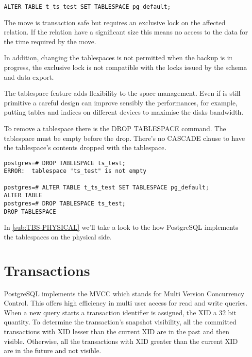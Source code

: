 \begin{lstlisting}[style=pgsql]
ALTER TABLE t_ts_test SET TABLESPACE pg_default;
\end{lstlisting}

The move is transaction safe but requires an exclusive lock on the affected 
relation. If the relation have a significant size this means no access to 
the data for the time required by the move.

In addition, changing the tablespaces is not permitted when the backup is in 
progress, the exclusive lock is not compatible with the locks issued by the 
schema and data export.

The tablespace feature adds flexibility to the space management. Even if is 
still primitive a careful design can improve sensibly the performances, for 
example, putting tables and indices on different devices to maximise the disks 
bandwidth.

To remove a tablespace there is the  DROP TABLESPACE command. The tablespace 
must be empty before the drop. There's no CASCADE clause to have the 
tablespace's contents dropped with the tablespace.

\begin{lstlisting}[style=pgsql]
postgres=# DROP TABLESPACE ts_test;
ERROR:  tablespace "ts_test" is not empty

postgres=# ALTER TABLE t_ts_test SET TABLESPACE pg_default;
ALTER TABLE
postgres=# DROP TABLESPACE ts_test;
DROP TABLESPACE

\end{lstlisting}

In \ref{sub:TBS-PHYSICAL} we'll take a look to the how PostgreSQL 
implements the tablespaces on the physical side.

\section{Transactions}
\label{sec:TRANSACTION}
PostgreSQL implements the MVCC which stands for Multi Version 
Concurrency Control. 
This offers high efficiency in multi user access for read and write queries.
When a new query starts a transaction identifier is assigned, the XID 
 a 32 bit quantity. To determine the transaction's snapshot 
visibility, all the committed transactions with XID lesser than the current XID 
are in the past and then visible. Otherwise, all the transactions with XID 
greater than the current XID are in the future and not visible.\newline

